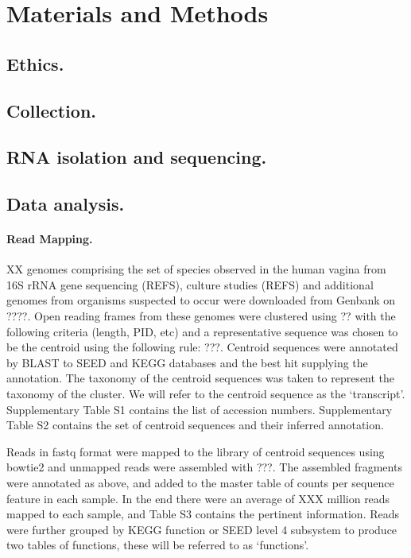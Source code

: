 \documentclass[10pt,letterpaper]{article}
\begin{document}
\section*{Materials and Methods}
\subsection*{Ethics.}
\subsection*{Collection.}
\subsection*{RNA isolation and sequencing.}
\subsection*{Data analysis.} 

\paragraph{Read Mapping.} XX genomes comprising the set of species observed in the human vagina from 16S rRNA gene sequencing (REFS), culture studies (REFS) and additional genomes from organisms suspected to occur were downloaded from Genbank on ????. Open reading frames from these genomes were clustered using ?? with the following criteria (length, PID, etc) and a representative sequence was chosen to be the centroid using the following rule: ???. Centroid sequences were annotated by BLAST to SEED and KEGG databases and the best hit supplying the annotation. The taxonomy of the centroid sequences was taken to represent the taxonomy of the cluster. We will refer to the centroid sequence as the `transcript'. Supplementary Table S1 contains the list of accession numbers. Supplementary Table S2 contains the set of centroid sequences and their inferred annotation. 

Reads in fastq format were mapped to the library of centroid sequences using bowtie2 \cite{bowtie2} and unmapped reads were assembled with ???. The assembled fragments were annotated as above, and added to the master table of counts per sequence feature in each sample. In the end there were an average of XXX million reads mapped to each sample, and Table S3 contains the pertinent information. Reads were further grouped by KEGG function or SEED level 4 subsystem to produce two tables of functions, these will be referred to as `functions'.
\end{document}
